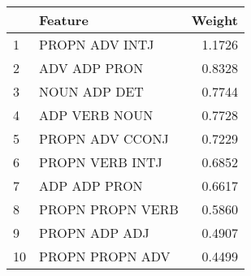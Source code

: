 \begin{tabular}{llr}
\toprule
{} &           Feature &  Weight \\
\midrule
1  &    PROPN ADV INTJ &  1.1726 \\
2  &      ADV ADP PRON &  0.8328 \\
3  &      NOUN ADP DET &  0.7744 \\
4  &     ADP VERB NOUN &  0.7728 \\
5  &   PROPN ADV CCONJ &  0.7229 \\
6  &   PROPN VERB INTJ &  0.6852 \\
7  &      ADP ADP PRON &  0.6617 \\
8  &  PROPN PROPN VERB &  0.5860 \\
9  &     PROPN ADP ADJ &  0.4907 \\
10 &   PROPN PROPN ADV &  0.4499 \\
\bottomrule
\end{tabular}

